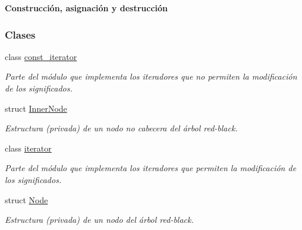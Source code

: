 \begin{Indent}{\bf \-Construcción, asignación y destrucción}
\subsubsection*{Clases}
\begin{DoxyCompactItemize}
\item 
class \hyperlink{classaed2_1_1iterator_1_1const__iterator}{const\+\_\+iterator}
\begin{DoxyCompactList}\small\item\em Parte del módulo que implementa los iteradores que no permiten la modificación de los significados. \end{DoxyCompactList}\item 
struct \hyperlink{structaed2_1_1iterator_1_1InnerNode}{Inner\+Node}
\begin{DoxyCompactList}\small\item\em Estructura (privada) de un nodo no cabecera del árbol red-\/black. \end{DoxyCompactList}\item 
class \hyperlink{classaed2_1_1iterator_1_1iterator}{iterator}
\begin{DoxyCompactList}\small\item\em Parte del módulo que implementa los iteradores que permiten la modificación de los significados. \end{DoxyCompactList}\item 
struct \hyperlink{structaed2_1_1iterator_1_1Node}{Node}
\begin{DoxyCompactList}\small\item\em Estructura (privada) de un nodo del árbol red-\/black. \end{DoxyCompactList}\end{DoxyCompactItemize}

\end{Indent}
